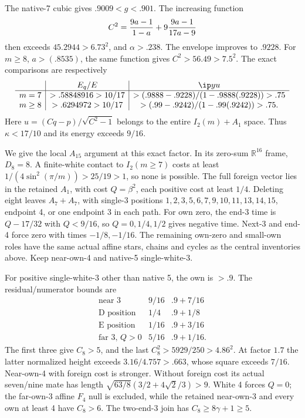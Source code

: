 The native-7 cubic gives \(.9009<g<.901\).
The increasing function
\[
 C^2={9a-1\over1-a}
          +9{9a-1\over17a-9}
\]
then exceeds \(45.2944>6.73^2\), and \(\alpha>.238\).
The envelope improves to \(.9228\).
For \(m\ge8\), \(a>(.8535)\), the same function gives
\(C^2>56.49>7.5^2\).
The exact comparisons are respectively
\[
 \begin{array}{c|c|c}
 &E_q/E&\ip yu\\ \hline
 m=7&>.58848916>10/17&
       >(.9888-.9228)/(1-.9888(.9228))>.75\\
 m\ge8&>.6294972>10/17&
       >(.99-.9242)/(1-.99(.9242))>.75 .
 \end{array}
\]
Here \(u=(Cq-p)/\sqrt{C^2-1}\) belongs to the entire
\(I_2(m)+A_1\) space.  Thus \(\kappa<17/10\) and
its energy exceeds \(9/16\).

We give the local \(A_{15}\) argument at this exact factor.
In its zero-sum \(\mathbb R^{16}\) frame, \(D_8=8\).
A finite-white contact to \(I_2(m\ge7)\) costs at least
\(1/(4\sin^2(\pi/m))>25/19>1\), so none is possible.
The full foreign vector lies in the retained \(A_1\), with cost
\(Q=\beta^2\), each positive cost at least \(1/4\).
Deleting eight leaves \(A_7+A_7\), with single-3 positions
\(1,2,3,5,6,7,9,10,11,13,14,15\), endpoint 4,
or one endpoint 3 in each path.
For own zero, the end-3 time is \(Q-17/32\) with
\(Q<9/16\), so \(Q=0,1/4,1/2\) gives negative time.
Next-3 and end-4 force zero with times \(-1/8,-1/16\).
The remaining own-zero and small-own roles have the same actual
affine stars, chains and cycles as the central inventories above.
Keep near-own-4 and native-5 single-white-3.

For positive single-white-3 other than native 5, the own is \(>.9\).
The residual/numerator bounds are
\[
 \begin{array}{c|c|c}
 \text{near 3}&9/16&.9+7/16\\
 \text{D position}&1/4&.9+1/8\\
 \text{E position}&1/16&.9+3/16\\
 \text{far 3, }Q>0&5/16&.9+1/16 .
 \end{array}
\]
The first three give \(C_8>5\), and the last
\(C_8^2>5929/250>4.86^2\).
At factor \(1.7\) the latter normalized height exceeds
\(3.16/4.757>.663\), whose square exceeds \(7/16\).
Near-own-4 with foreign cost is stronger.
Without foreign cost its actual seven/nine mate has length
\(\sqrt{63/8}(3/2+4\sqrt2/3)>9\).
White 4 forces \(Q=0\); the far-own-3 affine \(F_4\) null is
excluded, while the retained near-own-3 and every own at least 4
have \(C_8>6\).
The two-end-3 join has \(C_8\ge8\gamma+1\ge5\).


